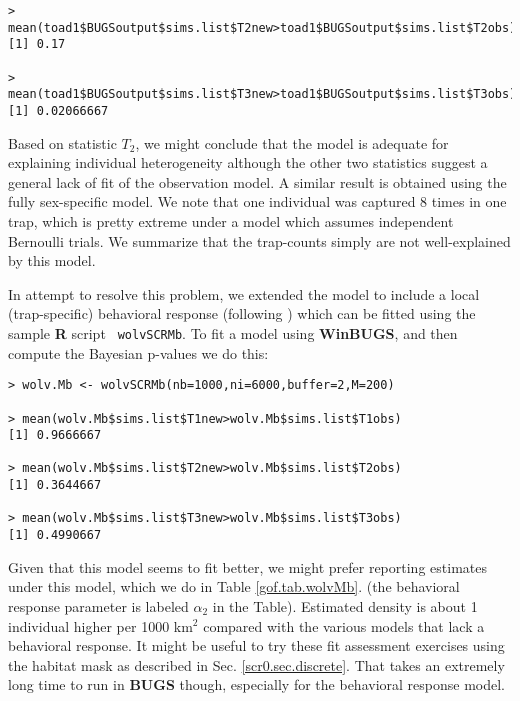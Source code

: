 {{\begin{verbatim}
> mean(toad1$BUGSoutput$sims.list$T2new>toad1$BUGSoutput$sims.list$T2obs)
[1] 0.17

> mean(toad1$BUGSoutput$sims.list$T3new>toad1$BUGSoutput$sims.list$T3obs)
[1] 0.02066667
\end{verbatim}
}
Based on statistic  $T_2$, we might conclude that the model
is adequate for explaining individual heterogeneity although the other
two statistics 
 suggest a general lack of fit of the observation model.
A similar result is obtained using the fully sex-specific
model.
We 
note that one individual was captured 8 times in one trap, which is
pretty extreme under a model which assumes independent Bernoulli
trials. We summarize that the trap-counts simply are not
well-explained by this model.

\begin{comment}
This produces:
\begin{verbatim}
fully sex-specific model:
>  mean(toad4$BUGSoutput$sims.list$T1new>toad4$BUGSoutput$sims.list$T1obs)
[1] 0
>  mean(toad4$BUGSoutput$sims.list$T2new>toad4$BUGSoutput$sims.list$T2obs)
[1] 0.234
>  mean(toad4$BUGSoutput$sims.list$T3new>toad4$BUGSoutput$sims.list$T3obs)
[1] 0.02133333
\end{verbatim}
which doesn't improve fit very much at all.
\end{comment}

In attempt to resolve this problem, we extended the model to include a
local (trap-specific)
behavioral response (following \citet{royle_etal:2011jwm}) which can
be fitted using the sample {\bf R} script \mbox{\tt
  wolvSCRMb}. 
To fit a model using {\bf WinBUGS}, and then compute the
Bayesian p-values we do this:
\begin{verbatim}
> wolv.Mb <- wolvSCRMb(nb=1000,ni=6000,buffer=2,M=200)

> mean(wolv.Mb$sims.list$T1new>wolv.Mb$sims.list$T1obs)
[1] 0.9666667

> mean(wolv.Mb$sims.list$T2new>wolv.Mb$sims.list$T2obs)
[1] 0.3644667

> mean(wolv.Mb$sims.list$T3new>wolv.Mb$sims.list$T3obs)
[1] 0.4990667
\end{verbatim}
Given that this model seems to fit better, we might prefer reporting
estimates under this model, which we do in Table \ref{gof.tab.wolvMb}.
(the behavioral response parameter is labeled $\alpha_2$ in the
Table).  Estimated density is about 1 individual higher per 1000
km$^2$ compared with the various models that lack a behavioral
response.  It might be useful to try these fit assessment exercises
using the habitat mask as described in
Sec. \ref{scr0.sec.discrete}. That takes an extremely long time to run
in \mbox{\bf BUGS} though, especially for the behavioral response
model.



}
